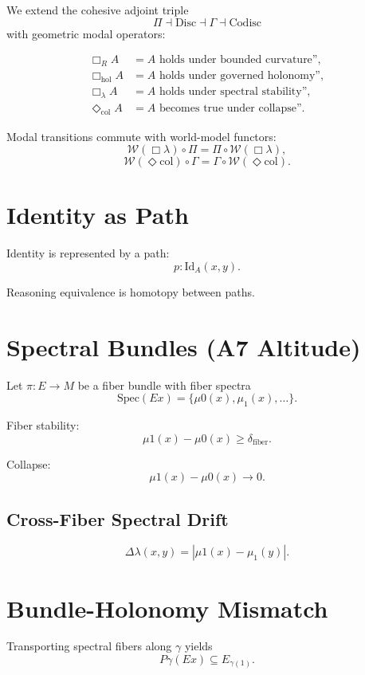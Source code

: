 \documentclass[11pt]{article}
\begin{document}
We extend the cohesive adjoint triple
\[
\Pi \dashv \mathrm{Disc} \dashv \Gamma \dashv \mathrm{Codisc}
\]
with geometric modal operators:

\begin{align*}
\Box_R A &= \text{$A$ holds under bounded curvature''},\\
\Box_{\mathrm{hol}} A &= \text{$A$ holds under governed holonomy''},\\
\Box_{\lambda} A &= \text{$A$ holds under spectral stability''},\\
\Diamond_{\mathrm{col}} A &= \text{$A$ becomes true under collapse''}.
\end{align*}

Modal transitions commute with world-model functors:
\[
\mathcal{W}(\Box{\lambda}) \circ \Pi = \Pi \circ \mathcal{W}(\Box{\lambda}),
\]
\[
\mathcal{W}(\Diamond{\mathrm{col}}) \circ \Gamma = \Gamma \circ \mathcal{W}(\Diamond{\mathrm{col}}).
\]

\section{Identity as Path}

Identity is represented by a path:
\[
p : \mathrm{Id}_A(x,y).
\]

Reasoning equivalence is homotopy between paths.

\section{Spectral Bundles (A7 Altitude)}

Let $\pi : E \to M$ be a fiber bundle with fiber spectra
\[
\mathrm{Spec}(Ex) = \{\mu0(x), \mu_1(x), \ldots\}.
\]

Fiber stability:
\[
\mu1(x) - \mu0(x) \geq \delta_{\mathrm{fiber}}.
\]

Collapse:
\[
\mu1(x) - \mu0(x) \to 0.
\]

\subsection{Cross-Fiber Spectral Drift}

\[
\Delta{\lambda}(x,y) = |\mu1(x) - \mu_1(y)|.
\]

\section{Bundle-Holonomy Mismatch}

Transporting spectral fibers along $\gamma$ yields
\[
P\gamma(Ex) \subseteq E_{\gamma(1)}.
\]
\end{document}
